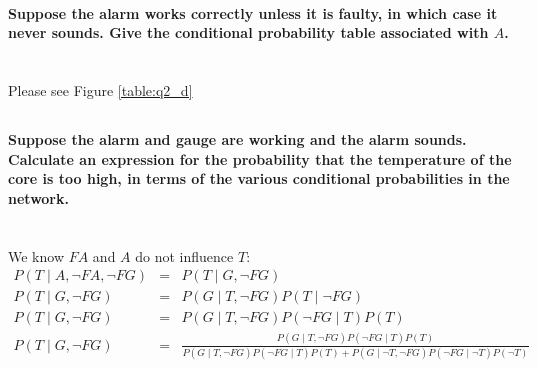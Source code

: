 \documentclass[	DIV=calc,%
				paper=a4,%
				fontsize=11pt,%
				twocolumn]{article}	 %
\begin{document}
\paragraph{Suppose the alarm works correctly unless it is faulty, in which case it never
sounds. Give the conditional probability table associated with $A$.}
~\\
Please see Figure \ref{table:q2_d}
\subsection{}
\paragraph{Suppose the alarm and gauge are working and the alarm sounds. Calculate
an expression for the probability that the temperature of the core is too high, in
terms of the various conditional probabilities in the network.}
~\\
We know $FA$ and $A$ do not influence $T$:
\setcounter{equation}{0}
\begin{eqnarray}
P( T \mid A, \neg {FA}, \neg {FG} ) &=& P( T \mid G, \neg {FG})\\
P( T \mid G, \neg {FG}) &=& P(G \mid T, \neg{FG})P(T\mid\neg{FG})\\
P( T \mid G, \neg {FG}) &=& P(G \mid T, \neg{FG})P(\neg{FG}\mid{T})P(T)\\
P( T \mid G, \neg {FG}) &=& \frac{P(G \mid T, \neg{FG})P(\neg{FG}\mid{T})P(T)}
{P(G \mid T, \neg{FG})P(\neg{FG}\mid{T})P(T) + P(G \mid\neg{T}, \neg{FG})P(\neg{FG}\mid\neg{T})P(\neg{T})}
\end{eqnarray}
\end{document}
